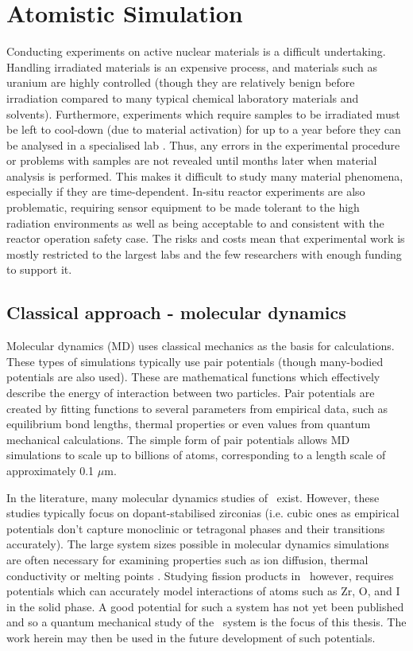 \section{Atomistic Simulation}

Conducting experiments on active nuclear materials is a difficult undertaking. Handling irradiated materials is an expensive process, and materials such as uranium are highly controlled (though they are relatively benign before irradiation compared to many typical chemical laboratory materials and solvents). Furthermore, experiments which require samples to be irradiated must be left to cool-down (due to material activation) for up to a year before they can be analysed in a specialised lab \cite{efthymiopoulos2011hiradmat}. Thus, any errors in the experimental procedure or problems with samples are not revealed until months later when material analysis is performed. This makes it difficult to study many material phenomena, especially if they are time-dependent. In-situ reactor experiments are also problematic, requiring sensor equipment to be made tolerant to the high radiation environments as well as being acceptable to and consistent with the reactor operation safety case. The risks and costs mean that experimental work is mostly restricted to the largest labs and the few researchers with enough funding to support it.

\subsection{Classical approach - molecular dynamics}

Molecular dynamics (MD) uses classical mechanics as the basis for calculations. These types of simulations typically use pair potentials (though many-bodied potentials are also used). These are mathematical functions which effectively describe the energy of interaction between two particles. Pair potentials are created by fitting functions to several parameters from empirical data, such as equilibrium bond lengths, thermal properties or even values from quantum mechanical calculations. The simple form of pair potentials allows MD simulations to scale up to billions of atoms, corresponding to a length scale of approximately 0.1 $\mu$m. 

In the literature, many molecular dynamics studies of \zirconia\ exist. However, these studies typically focus on dopant-stabilised zirconias (i.e. cubic ones as empirical potentials don't capture monoclinic or tetragonal phases and their transitions accurately). The large system sizes possible in molecular dynamics simulations are often necessary for examining properties such as ion diffusion, thermal conductivity or melting points \cite{Davis2010}. Studying fission products in \zirconia\ however, requires potentials which can accurately model interactions of atoms such as Zr, O, and I in the solid phase. A good potential for such a system has not yet been published and so a quantum mechanical study of the \zirconia\ system is the focus of this thesis. The work herein may then be used in the future development of such potentials.

